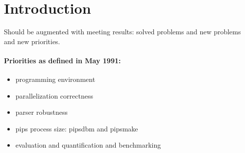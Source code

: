 %
\newcommand{\titre}{PIPS BUGS and WISHES \\
                    Version 1.1 \\
                        Draft (November 21, 1991)}
\newcommand{\auteur}{Franc,ois Irigoin\\
                et al.}
\newcommand{\docdate}{10 January 1992}
\newcommand{\numero}{Exxx}




\tableofcontents

\newpage

\section*{Introduction}

Should be augmented with meeting results: solved problems and new
problems and new priorities.

\paragraph{Priorities as defined in May 1991:}

\begin{itemize}

  \item programming environment  

  \item parallelization correctness  

  \item parser robustness  

  \item pips process size: pipsdbm and pipsmake 

  \item evaluation and quantification and benchmarking 

\end{itemize}

